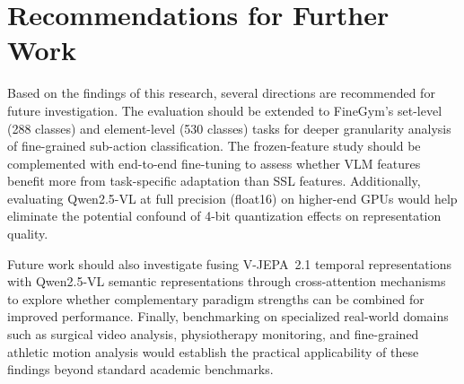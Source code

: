 \section{Recommendations for Further Work}

Based on the findings of this research, several directions are recommended for future investigation. The evaluation should be extended to FineGym's set-level (288 classes) and element-level (530 classes) tasks for deeper granularity analysis of fine-grained sub-action classification. The frozen-feature study should be complemented with end-to-end fine-tuning to assess whether VLM features benefit more from task-specific adaptation than SSL features. Additionally, evaluating Qwen2.5-VL at full precision (float16) on higher-end GPUs would help eliminate the potential confound of 4-bit quantization effects on representation quality.

Future work should also investigate fusing V-JEPA~2.1 temporal representations with Qwen2.5-VL semantic representations through cross-attention mechanisms to explore whether complementary paradigm strengths can be combined for improved performance. Finally, benchmarking on specialized real-world domains such as surgical video analysis, physiotherapy monitoring, and fine-grained athletic motion analysis would establish the practical applicability of these findings beyond standard academic benchmarks.
